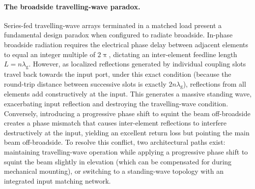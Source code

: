 \paragraph{The broadside travelling-wave paradox.}
Series-fed travelling-wave arrays terminated in a matched load present a fundamental design paradox when configured to radiate broadside.
In-phase broadside radiation requires the electrical phase delay between adjacent elements to equal an integer multiple of $2\uppi$, dictating an inter-element feedline length $L = n\lambda_{\mathrm{g}}$.
However, as localized reflections generated by individual coupling slots travel back towards the input port, under this exact condition (because the round-trip distance between successive slots is exactly $2n\lambda_{\mathrm{g}}$), reflections from all elements add constructively at the input.
This generates a massive standing wave, exacerbating input reflection and destroying the travelling-wave condition.
Conversely, introducing a progressive phase shift to squint the beam off-broadside creates a phase mismatch that causes inter-element reflections to interfere destructively at the input, yielding an excellent return loss but pointing the main beam off-broadside.
To resolve this conflict, two architectural paths exist: maintaining travelling-wave operation while applying a progressive phase shift to squint the beam slightly in elevation (which can be compensated for during mechanical mounting), or switching to a standing-wave topology with an integrated input matching network.

